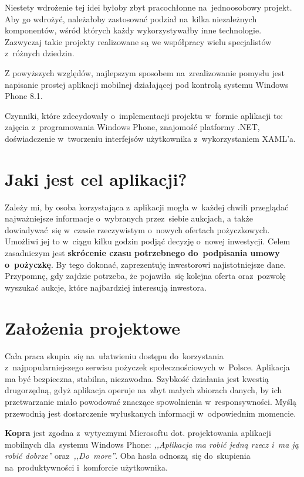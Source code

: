 \documentclass[a4paper,twoside,titlepage,openright]{book}
\begin{document}
Niestety wdrożenie tej idei byłoby zbyt pracochłonne na~jednoosobowy projekt. Aby go wdrożyć, należałoby zastosować podział na~kilka niezależnych komponentów, wśród których każdy wykorzystywałby inne technologie. Zazwyczaj takie projekty realizowane są we współpracy wielu specjalistów z~różnych dziedzin.

Z powyższych względów, najlepszym sposobem na~zrealizowanie pomysłu jest napisanie prostej aplikacji mobilnej działającej pod kontrolą systemu Windows Phone 8.1. 

Czynniki, które zdecydowały o~implementacji projektu w~formie aplikacji to: zajęcia z~programowania Windows Phone, znajomość platformy .NET, doświadczenie w~tworzeniu interfejsów użytkownika z~wykorzystaniem XAML'a.

\section*{Jaki jest cel aplikacji?}

Zależy mi, by osoba korzystająca z~aplikacji mogła w~każdej chwili przeglądać najważniejsze informacje o~wybranych przez~siebie aukcjach, a także dowiadywać~się w~czasie rzeczywistym o~nowych ofertach pożyczkowych. Umożliwi jej to w~ciągu kilku godzin podjąć decyzję o~nowej inwestycji. Celem zasadniczym jest \textbf{skrócenie czasu potrzebnego do~podpisania umowy o~pożyczkę}. By tego dokonać, zaprezentuję inwestorowi najistotniejsze dane. Przypomnę, gdy zajdzie potrzeba, że pojawiła~się kolejna oferta oraz~pozwolę wyszukać aukcje, które najbardziej interesują inwestora.

\section*{Założenia projektowe}

Cała praca skupia~się na~ułatwieniu dostępu do~korzystania z~najpopularniejszego serwisu pożyczek społecznościowych w~Polsce. Aplikacja ma być bezpieczna, stabilna, niezawodna. Szybkość działania jest kwestią drugorzędną, gdyż aplikacja operuje na~zbyt małych zbiorach danych, by ich przetwarzanie miało powodować znaczące spowolnienia w~responsywności. Myślą przewodnią jest dostarczenie wyłuskanych informacji w~odpowiednim momencie. 

\textbf{Kopra} jest zgodna z~wytycznymi Microsoftu dot. projektowania aplikacji mobilnych dla~systemu Windows Phone: \textit{,,Aplikacja ma robić jedną rzecz i~ma ją robić dobrze''}\cite{wpDesign} oraz~\textit{,,Do~more''}\cite{doMore}. Oba hasła odnoszą~się do~skupienia na~produktywności i~komforcie użytkownika. 
\end{document}
